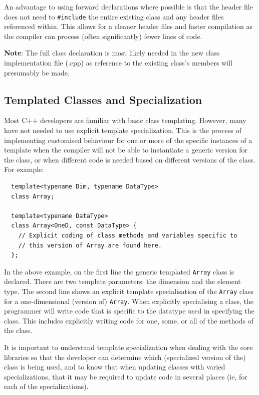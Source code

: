An advantage to using forward declarations where possible is that the header file does not need to \lstinline{#include} the entire existing class and any header files referenced within.  This allows for a
cleaner header files and faster compilation as the compiler can process (often significantly) fewer lines of code.

\textbf{Note}: The full class declaration is most likely needed in the new class implementation file (.cpp) as reference to the existing class's members will presumably be made.
  
\subsection{Templated Classes and Specialization}
Most C++ developers are
familiar with basic class templating.  However, many have not needed
to use explicit template specialization.  This is the process of
implementing customised behaviour for one or more of the specific instances of a template when
the compiler will not be able to instantiate a generic version for
the class, or when different code is needed based on different
versions of the class.  For example:
\begin{lstlisting}
  template<typename Dim, typename DataType> 
  class Array;
  
  template<typename DataType>
  class Array<OneD, const DataType> {
    // Explicit coding of class methods and variables specific to
    // this version of Array are found here.
  };
\end{lstlisting}

In the above example, on the first line the generic templated
\lstinline{Array} class is declared. There are two template parameters: the dimension and the element type. The second line shows an explicit
template specialisation of the \lstinline{Array} class for a one-dimensional (version of) \lstinline{Array}.  When explicitly specialising a class, the programmer
will write code that is specific to the datatype used in specifying
the class.  This includes explicitly writing code for one, some, or
all of the methods of the class.

It is important to understand template specialization when dealing
with the {\nek} core libraries so that the developer can
determine which (specialized version of the) class is being used,
and to know that when updating classes with varied specializations,
that it may be required to update code in several places (ie, for
each of the specializations).

